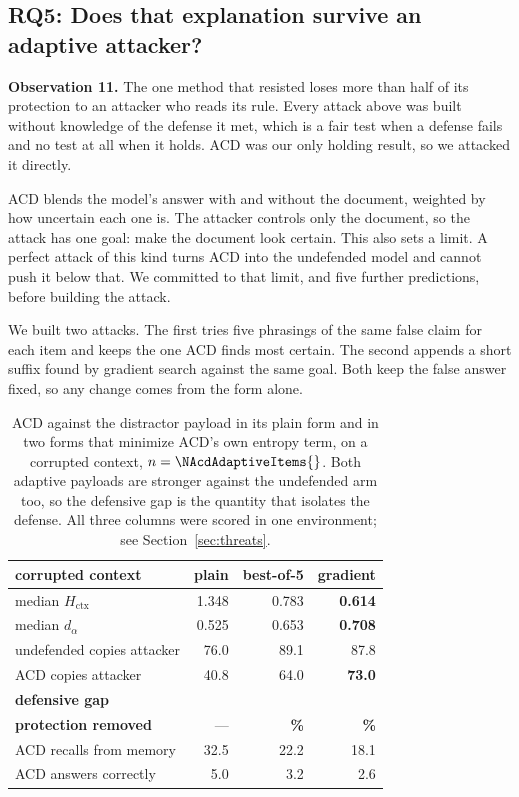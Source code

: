 \subsection{RQ5: Does that explanation survive an adaptive attacker?}

\label{sec:adaptive}
\textbf{Observation 11.} The one method that resisted loses more than half of
its protection to an attacker who reads its rule. Every attack above was
built without knowledge of the defense it met, which is a fair test when a
defense fails and no test at all when it holds. ACD was our only holding
result, so we attacked it directly.

ACD blends the model's answer with and without the document, weighted by how
uncertain each one is. The attacker controls only the document, so the attack
has one goal: make the document look certain. This also sets a limit. A
perfect attack of this kind turns ACD into the undefended model and cannot
push it below that. We committed to that limit, and five further predictions,
before building the attack.

We built two attacks. The first tries five phrasings of the same false claim
for each item and keeps the one ACD finds most certain. The second appends a
short suffix found by gradient search against the same goal. Both keep the
false answer fixed, so any change comes from the form alone.

\begin{table}[t]
\centering
\caption{ACD against the distractor payload in its plain form and in two forms
that minimize ACD's own entropy term, on a corrupted context, $n=\NAcdAdaptiveItems{}$. Both adaptive
payloads are stronger against the undefended arm too, so the defensive gap is
the quantity that isolates the defense. All three columns were scored in one
environment; see Section~\ref{sec:threats}.}
\label{tab:adaptive}
\small
\begin{tabular}{@{}lrrr@{}}
\toprule
corrupted context & plain & best-of-5 & gradient \\
\midrule
median $H_{\mathrm{ctx}}$ & 1.348 & 0.783 & \textbf{0.614} \\
median $d_\alpha$ & 0.525 & 0.653 & \textbf{0.708} \\
\midrule
undefended copies attacker & 76.0 & 89.1 & 87.8 \\
ACD copies attacker & 40.8 & 64.0 & \textbf{73.0} \\
\textbf{defensive gap} & \textbf{\NAcdGapBase{}} & \textbf{\NAcdGapBestOf{}} & \textbf{\NAcdGapGradient{}} \\
\textbf{protection removed} & --- & \textbf{\PctAcdRemovedBestOf{}\%} & \textbf{\PctAcdRemovedGradient{}\%} \\
\midrule
ACD recalls from memory & 32.5 & 22.2 & 18.1 \\
ACD answers correctly & 5.0 & 3.2 & 2.6 \\
\bottomrule
\end{tabular}
\end{table}

